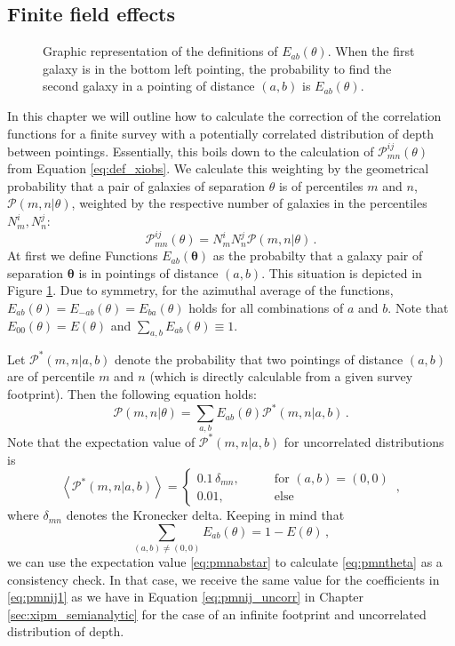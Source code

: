\documentclass[referee]{aa} %
\renewcommand{\[}{\begin{equation}}
\renewcommand{\]}{\end{equation}}
\def\b#1{\bm{#1}}
\def\la{\left<}
\def\ra{\right>}
\begin{document}
\begin{appendix}
\section{Finite field effects}
\label{sec:expand_eoftheta}
\begin{figure}
    \centering
    \def\svgwidth{200pt}    
      
    \caption{Graphic representation of the definitions of $E_{ab}(\theta)$. When the first galaxy is in the bottom left pointing, the probability to find the second galaxy in a pointing of distance $(a,b)$ is $E_{ab}(\theta)$.}
    \label{fig:expand_etheta}
\end{figure}
In this chapter we will outline how to calculate the correction of the correlation functions for a finite survey with a potentially correlated distribution of depth between pointings. Essentially, this boils down to the calculation of $\mathcal{P}_{mn}^{ij}(\theta)$ from Equation \eqref{eq:def_xiobs}. We calculate this weighting by the geometrical probability that a pair of galaxies of separation $\theta$ is of percentiles $m$ and $n$, $\mathcal{P}(m,n|\theta)$, weighted by the respective number of galaxies in the percentiles $N_m^i,N_n^j$: \[
\mathcal{P}_{mn}^{ij}(\theta) = N_m^iN_n^j\mathcal{P}(m,n|\theta)\, .
\label{eq:pmnij1}
\]
 At first we define Functions $E_{ab}(\b\theta)$ as the probabilty that a galaxy pair of separation $\b\theta$ is in pointings of distance $(a,b)$. This situation is depicted in Figure \ref{fig:expand_etheta}. Due to symmetry, for the azimuthal average of the functions, $E_{ab}(\theta) = E_{-ab}(\theta) = E_{ba}(\theta)$ holds for all combinations of $a$ and $b$. Note that $E_{00}(\theta)=E(\theta)$ and $\sum_{a,b}E_{ab}(\theta)\equiv 1$.

Let $\mathcal{P}^*(m,n|a,b)$ denote the probability that two pointings of distance $(a,b)$ are of percentile $m$ and $n$ (which is directly calculable from a given survey footprint). 
Then the following equation holds: \[
\mathcal{P}(m,n|\theta) = \sum_{a,b} E_{ab}(\theta)\mathcal{P}^*(m,n|a,b)\, .
\label{eq:pmntheta}
\]
Note that the expectation value of $\mathcal{P}^*(m,n|a,b)$ for uncorrelated distributions is \[
\la \mathcal{P}^*(m,n|a,b)\ra = \begin{cases}
0.1\,\delta_{mn},\qquad & \text{for }(a,b)=(0,0) \\
0.01, & \text{else}
\end{cases}\, ,
\label{eq:pmnabstar}
\]
where $\delta_{mn}$ denotes the Kronecker delta. Keeping in mind that \[
\sum_{(a,b)\neq (0,0)} E_{ab}(\theta) = 1-E(\theta)\, ,
\]
we can use the expectation value \eqref{eq:pmnabstar} to calculate \eqref{eq:pmntheta} as a consistency check. In that case, we receive the same value for the coefficients in \eqref{eq:pmnij1} as we have in Equation \eqref{eq:pmnij_uncorr} in Chapter \ref{sec:xipm_semianalytic} for the case of an infinite footprint and uncorrelated distribution of depth.


\end{appendix}
\end{document}
